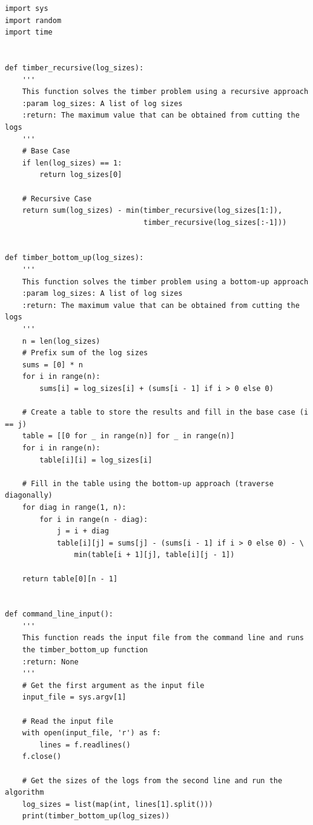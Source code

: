 \documentclass[12pt]{article}
\begin{document}
\begin{verbatim}
import sys
import random
import time


def timber_recursive(log_sizes):
    '''
    This function solves the timber problem using a recursive approach
    :param log_sizes: A list of log sizes
    :return: The maximum value that can be obtained from cutting the logs
    '''
    # Base Case
    if len(log_sizes) == 1:
        return log_sizes[0]

    # Recursive Case
    return sum(log_sizes) - min(timber_recursive(log_sizes[1:]),
                                timber_recursive(log_sizes[:-1]))


def timber_bottom_up(log_sizes):
    '''
    This function solves the timber problem using a bottom-up approach
    :param log_sizes: A list of log sizes
    :return: The maximum value that can be obtained from cutting the logs
    '''
    n = len(log_sizes)
    # Prefix sum of the log sizes
    sums = [0] * n
    for i in range(n):
        sums[i] = log_sizes[i] + (sums[i - 1] if i > 0 else 0)

    # Create a table to store the results and fill in the base case (i == j)
    table = [[0 for _ in range(n)] for _ in range(n)]
    for i in range(n):
        table[i][i] = log_sizes[i]

    # Fill in the table using the bottom-up approach (traverse diagonally)
    for diag in range(1, n):
        for i in range(n - diag):
            j = i + diag
            table[i][j] = sums[j] - (sums[i - 1] if i > 0 else 0) - \
                min(table[i + 1][j], table[i][j - 1])

    return table[0][n - 1]


def command_line_input():
    '''
    This function reads the input file from the command line and runs 
    the timber_bottom_up function
    :return: None
    '''
    # Get the first argument as the input file
    input_file = sys.argv[1]

    # Read the input file
    with open(input_file, 'r') as f:
        lines = f.readlines()
    f.close()

    # Get the sizes of the logs from the second line and run the algorithm
    log_sizes = list(map(int, lines[1].split()))
    print(timber_bottom_up(log_sizes))



\end{verbatim}
\end{document}
